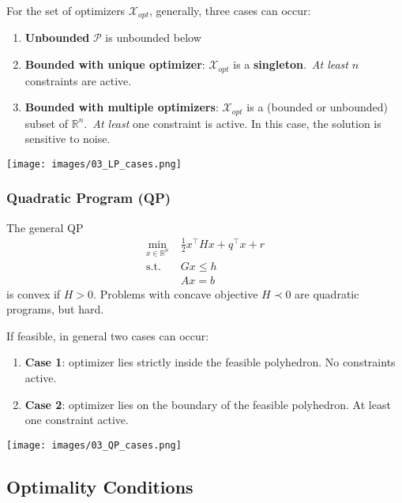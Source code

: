 \newpar{}
For the set of optimizers $\mathcal{X}_{opt}$, generally, three cases can occur:
\begin{enumerate}
    \item \textbf{Unbounded} $\mathcal{P}$ is unbounded below
    \item \textbf{Bounded with unique optimizer}: $\mathcal{X}_{opt}$ is a \textbf{singleton}.\ \textit{At least} $n$ constraints are active.
    \item \textbf{Bounded with multiple optimizers}: $\mathcal{X}_{opt}$ is a (bounded or unbounded) subset of $\mathbb{R}^n$.\ \textit{At least} one constraint is active. In this case, the solution is sensitive to noise. %
\end{enumerate}
\begin{center}
    \texttt{[image: images/03\_LP\_cases.png]}
\end{center}

\subsubsection{Quadratic Program (QP)}\label{optimizer_location_QP}
The general QP
\begin{align*}
    \min_{x\in\mathbb{R}^n}\; & \frac{1}{2}x^\top H x + q^\top x + r \\
    \mathrm{s.t.}\;           & Gx \leq h                            \\
                              & Ax = b
\end{align*}
is convex if $H>0$.
\newpar{}
Problems with concave objective $H\prec 0$ are quadratic programs, but hard.


\newpar{}
If feasible, in general two cases can occur:
\begin{enumerate}
    \item \textbf{Case 1}: optimizer lies strictly inside the feasible polyhedron. No constraints active.
    \item \textbf{Case 2}: optimizer lies on the boundary of the feasible polyhedron. At least one constraint active.
\end{enumerate}
\begin{center}
    \texttt{[image: images/03\_QP\_cases.png]}
\end{center}

\subsection{Optimality Conditions}

